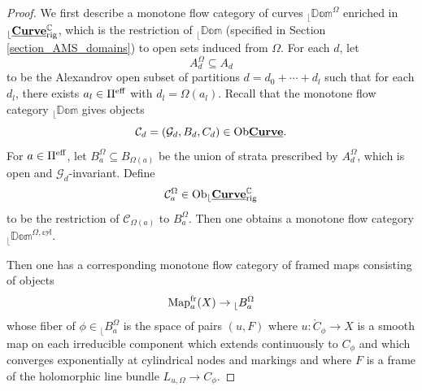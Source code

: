 \documentclass[reqno, 10pt]{amsart}
\numberwithin{equation}{section}
\numberwithin{equation}{section}
\renewcommand{\subset}{\subseteq}
\theoremstyle{definition}
\theoremstyle{remark}
\newcommand{\beqn}{\begin{equation*}}
\newcommand{\eeqn}{\end{equation*}}
\newcommand{\mb}{\mathbb}
\newcommand{\mc}{\mathcal}
\renewcommand{\outer}{{}_{\lfloor}}
\newcommand{\uds}[1]{\underline{\smash{#1}}}
\begin{document}
\begin{proof}
We first describe a monotone flow category of curves $\outer \mb{Dom}^\Omega$ enriched in $\outer \uds{\bf Curve}_{\rm rig}^{\mb C}$, which is the restriction of $\outer \mb{Dom}$ (specified in Section \ref{section_AMS_domains}) to open sets induced from $\Omega$. For each $d$, let
\beqn
A_d^\Omega \subset A_d
\eeqn
to be the Alexandrov open subset of partitions $d = d_0 + \cdots + d_l$ such that for each $d_l$, there exists $a_l \in \Pi^{\rm eff}$ with $d_l = \Omega(a_l)$. Recall that the monotone flow category $\outer \mb{Dom}$ gives objects
\beqn
{\mc C}_d = ({\mc G}_d, B_d, C_d) \in {\rm Ob} \uds{\bf Curve}.
\eeqn
For $a \in \Pi^{\rm eff}$, let $B_a^\Omega \subset B_{\Omega(a)}$ be the union of strata prescribed by $A_d^\Omega$, which is open and ${\mc G}_d$-invariant. Define
\beqn
{\mc C}_a^\Omega \in {\rm Ob} \outer \uds{\bf Curve}_{\rm rig}^{\mb C}
\eeqn
to be the restriction of ${\mc C}_{\Omega(a)}$ to $B_a^\Omega$. Then one obtains a monotone flow category $\outer \mb{Dom}^{\Omega, \mb{cyl}}$. 

Then one has a corresponding monotone flow category of framed maps consisting of objects
\beqn
{\rm Map}_a^{\rm fr} (X) \to \outer B_a^{\Omega}
\eeqn
whose fiber of $\phi \in \outer B_a^\Omega$ is the space of pairs $(u, F)$ where $u: \mathring C_\phi \to X$ is a smooth map on each irreducible component which extends continuously to $C_\phi$ and which converges exponentially at cylindrical nodes and markings and where $F$ is a frame of the holomorphic line bundle $L_{u, \Omega} \to C_\phi$.


\end{proof}
\end{document}
